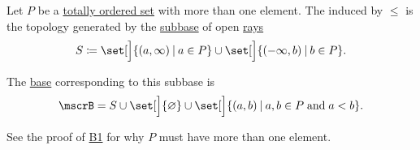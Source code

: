\begin{definition}\label{def:order_topology}
  Let \( P \) be a \hyperref[def:partially_ordered_set]{totally ordered set} with more than one element. The  induced by \( \leq \) is the topology generated by the \hyperref[def:topological_subbase]{subbase} of open \hyperref[def:partially_ordered_set_interval/ray]{rays}
  \begin{equation}\label{eq:def:order_topology/subbase}
    S \coloneqq \set[\Big]{ (a, \infty) \given a \in P } \cup \set[\Big]{ (-\infty, b) \given b \in P }.
  \end{equation}

  The \hyperref[def:topological_base]{base} corresponding to this subbase is
  \begin{equation}\label{eq:def:order_topology/base}
    \mscrB = S \cup \set[\Big]{ \varnothing } \cup \set[\Big]{ (a, b) \given a, b \in P \T{and} a < b }.
  \end{equation}

  See the proof of \hyperref[thm:topological_base_axioms/B1]{B1} for why \( P \) must have more than one element.
\end{definition}
